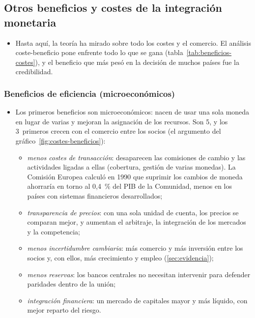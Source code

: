 \documentclass[11pt]{article}
\begin{document}
\subsection{Otros beneficios y costes de la integración monetaria}\label{sec:beneficios}

\begin{itemize}
\item Hasta aquí, la teoría ha mirado sobre todo los costes y el comercio. El análisis coste-beneficio pone enfrente todo lo que se gana (tabla~\ref{tab:beneficios-costes}), y el beneficio que más pesó en la decisión de muchos países fue la credibilidad.
\end{itemize}

\subsubsection{Beneficios de eficiencia (microeconómicos)}\label{sec:beneficios-micro}

\begin{itemize}
\item Los primeros beneficios son microeconómicos: nacen de usar una sola moneda en lugar de varias y mejoran la asignación de los recursos. Son 5, y los 3~primeros crecen con el comercio entre los socios (el argumento del gráfico~\ref{fig:costes-beneficios}):
  \begin{itemize}
  \item \emph{menos costes de transacción}: desaparecen las comisiones de cambio y las actividades ligadas a ellas (cobertura, gestión de varias monedas). La Comisión Europea calculó en 1990 que suprimir los cambios de moneda ahorraría en torno al 0,4~\% del PIB de la Comunidad, menos en los países con sistemas financieros desarrollados\nocite{CE1990OneMarket};
  \item \emph{transparencia de precios}: con una sola unidad de cuenta, los precios se comparan mejor, y aumentan el arbitraje, la integración de los mercados y la competencia;
  \item \emph{menos incertidumbre cambiaria}: más comercio y más inversión entre los socios y, con ellos, más crecimiento y empleo (\ref{sec:evidencia});
  \item \emph{menos reservas}: los bancos centrales no necesitan intervenir para defender paridades dentro de la unión;
  \item \emph{integración financiera}: un mercado de capitales mayor y más líquido, con mejor reparto del riesgo.
  \end{itemize}
\end{itemize}
\end{document}
